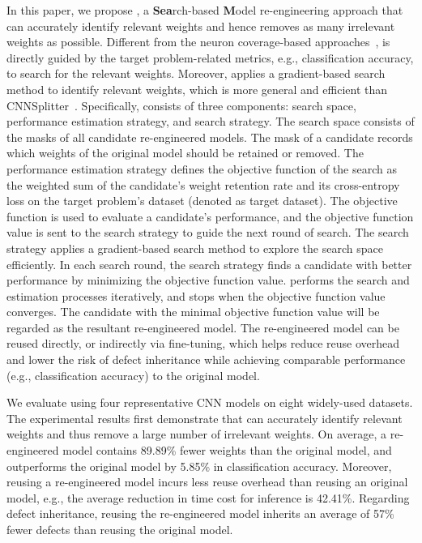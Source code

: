 In this paper, we propose \projectName, a \textbf{Sea}rch-based \textbf{M}odel re-engineering approach that can accurately identify relevant weights and hence removes as many irrelevant weights as possible.
Different from the neuron coverage-based approaches~\cite{nnmodularity2022icse,fse2020modularity,ReMos}, \projectName is directly guided by the target problem-related metrics, e.g., classification accuracy, to search for the relevant weights.
Moreover, \projectName applies a gradient-based search method to identify relevant weights, which is more general and efficient than CNNSplitter~\cite{qi2022patching}.
Specifically, \projectName consists of three components: search space, performance estimation strategy, and search strategy.
The search space consists of the masks of all candidate re-engineered models. The mask of a candidate records which weights of the original model should be retained or removed. %
The performance estimation strategy defines the objective function of the search as the weighted sum of the candidate's weight retention rate and its cross-entropy loss on the target problem's dataset (denoted as target dataset).
The objective function is used to evaluate a candidate's performance, and the objective function value is sent to the search strategy to guide the next round of search.
The search strategy applies a gradient-based search method to explore the search space efficiently. 
In each search round, the search strategy finds a candidate with better performance by minimizing the objective function value. %
\projectName performs the search and estimation processes iteratively, and stops %
when the objective function value converges.
The candidate with the minimal objective function value will be regarded %
as the resultant re-engineered model.
The re-engineered model can be reused directly, or indirectly via fine-tuning, which helps reduce reuse overhead and lower the risk of defect inheritance while achieving comparable performance (e.g., classification accuracy) to the original model.

We evaluate \projectName using four representative CNN models on eight widely-used datasets. 
The experimental results first demonstrate that \projectName can accurately identify relevant weights and thus remove a large number of irrelevant weights. 
On average, a re-engineered model contains 89.89\% fewer weights than the original model, and outperforms the original model by 5.85\% in classification accuracy.
Moreover, reusing a re-engineered model incurs less reuse overhead than reusing an original model, e.g., the average reduction in time cost for inference is 42.41\%. Regarding defect inheritance, reusing the re-engineered model inherits an average of 57\% fewer defects than reusing the original model.

